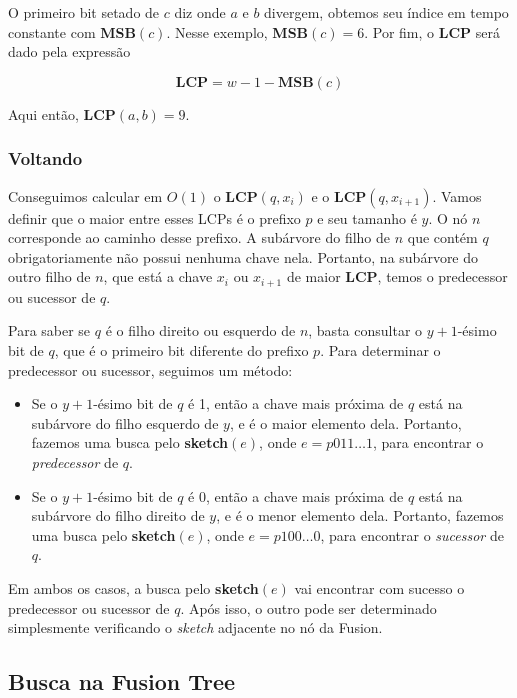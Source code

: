 O primeiro bit setado de $c$ diz onde $a$ e $b$ divergem, obtemos seu índice em
tempo constante com \textbf{MSB}$(c)$. Nesse exemplo, \textbf{MSB}$(c)=6$. Por
fim, o \textbf{LCP} será dado pela expressão

\[
\textbf{LCP} = w - 1 - \textbf{MSB}(c)
\]

Aqui então, \textbf{LCP}$(a,b)=9$.

\subsubsection{Voltando}

Conseguimos calcular em $O(1)$ o \textbf{LCP}$(q, x_i)$ e o \textbf{LCP}$(q,
x_{i+1})$. Vamos definir que o maior entre esses LCPs é o prefixo $p$ e seu
tamanho é $y$. O nó $n$ corresponde ao caminho desse prefixo. A subárvore do
filho de $n$ que contém $q$ obrigatoriamente não possui nenhuma chave nela.
Portanto, na subárvore do outro filho de $n$, que está a chave $x_i$ ou
$x_{i+1}$ de maior \textbf{LCP}, temos o predecessor ou sucessor de $q$.

Para saber se $q$ é o filho direito ou esquerdo de $n$, basta consultar o
$y+1$-ésimo bit de $q$, que é o primeiro bit diferente do prefixo $p$. Para
determinar o predecessor ou sucessor, seguimos um método:

\begin{itemize}
    \item Se o $y+1$-ésimo bit de $q$ é 1, então a chave mais próxima de $q$
    está na subárvore do filho esquerdo de $y$, e é o maior elemento dela.
    Portanto, fazemos uma busca pelo \textbf{sketch}$(e)$, onde $e=p011\dots1$,
    para encontrar o \textit{predecessor} de $q$. 
    \item Se o $y+1$-ésimo bit de $q$ é 0, então a chave mais próxima de $q$
    está na subárvore do filho direito de $y$, e é o menor elemento dela.
    Portanto, fazemos uma busca pelo \textbf{sketch}$(e)$, onde $e=p100\dots0$,
    para encontrar o \textit{sucessor} de $q$. 
\end{itemize}

Em ambos os casos, a busca pelo \textbf{sketch}$(e)$ vai encontrar com sucesso o
predecessor ou sucessor de $q$. Após isso, o outro pode ser determinado
simplesmente verificando o \textit{sketch} adjacente no nó da Fusion.

\subsection{Busca na Fusion Tree}

